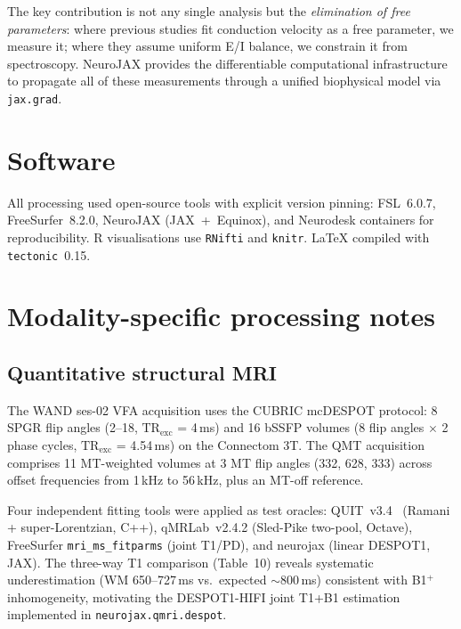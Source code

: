 \documentclass[11pt,a4paper]{article}\usepackage[]{graphicx}\usepackage[]{xcolor}
\begin{document}
The key contribution is not any single analysis but the \emph{elimination
of free parameters}: where previous studies fit conduction velocity as a
free parameter, we measure it; where they assume uniform E/I balance, we
constrain it from spectroscopy. NeuroJAX provides the differentiable
computational infrastructure to propagate all of these measurements through
a unified biophysical model via \texttt{jax.grad}.

\section*{Software}

All processing used open-source tools with explicit version pinning:
FSL~6.0.7, FreeSurfer~8.2.0, NeuroJAX (JAX~+~Equinox), and
Neurodesk containers for reproducibility. R visualisations use
\texttt{RNifti} and \texttt{knitr}. \LaTeX{} compiled with
\texttt{tectonic}~0.15.



\appendix

\section{Modality-specific processing notes}

\subsection{Quantitative structural MRI}

The WAND ses-02 VFA acquisition uses the CUBRIC mcDESPOT protocol: 8
SPGR flip angles (2--18\textdegree, $\text{TR}_\text{exc}$ = 4\,ms)
and 16 bSSFP volumes (8 flip angles $\times$ 2 phase cycles,
$\text{TR}_\text{exc}$ = 4.54\,ms) on the Connectom 3T. The
QMT acquisition comprises 11 MT-weighted volumes at 3 MT flip angles
(332\textdegree, 628\textdegree, 333\textdegree) across offset
frequencies from 1\,kHz to 56\,kHz, plus an MT-off reference.

Four independent fitting tools were applied as test oracles:
QUIT~v3.4~\citep{Wood2018quit} (Ramani + super-Lorentzian, C++),
qMRLab~v2.4.2 (Sled-Pike two-pool, Octave), FreeSurfer
\texttt{mri\_ms\_fitparms} (joint T1/PD), and neurojax (linear
DESPOT1, JAX). The three-way T1 comparison (Table~10) reveals
systematic underestimation (WM 650--727\,ms vs.\ expected $\sim$800\,ms)
consistent with B1$^+$ inhomogeneity, motivating the DESPOT1-HIFI
joint T1+B1 estimation implemented in \texttt{neurojax.qmri.despot}.
\end{document}

